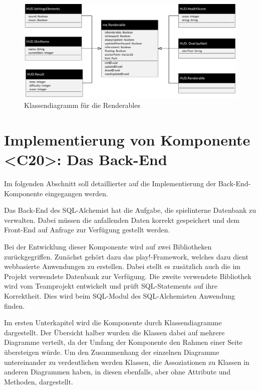 \newpage
\begin{figure}[ht]
\centering
\includegraphics[width=1.0\textwidth]{figures/KLassendiagrammRenderables.pdf}
\caption{Klassendiagramm für die Renderables}
\label{MErenderable}
\end{figure}    

\newpage


\newpage
\section{Implementierung von Komponente <C20>: Das Back-End}
\label{backend}

Im folgenden Abschnitt soll detaillierter auf die Implementierung der Back-End-Komponente eingegangen werden.

Das Back-End des SQL-Alchemist hat die Aufgabe, die spielinterne Datenbank zu verwalten. Dabei müssen die anfallenden Daten korrekt gespeichert und dem Front-End auf Anfrage zur Verfügung gestellt werden.

Bei der Entwicklung dieser Komponente wird auf zwei Bibliotheken zurückgegriffen. Zunächst gehört dazu das play!-Framework, welches dazu dient webbasierte Anwendungen zu erstellen. Dabei stellt es zusätzlich auch die im Projekt verwendete Datenbank zur Verfügung. Die zweite verwendete Bibliothek wird vom Teamprojekt entwickelt und prüft SQL-Statements auf ihre Korrektheit. Dies wird beim SQL-Modul des SQL-Alchemisten Anwendung finden. 

Im ersten Unterkapitel wird die Komponente durch Klassendiagramme dargestellt. Der Übersicht halber wurden die Klassen dabei auf mehrere Diagramme verteilt, da der Umfang der Komponente den Rahmen einer Seite übersteigen würde. Um den Zusammenhang der einzelnen Diagramme untereinander zu verdeutlichen werden Klassen, die Assoziationen zu Klassen in anderen Diagrammen haben, in diesen ebenfalls, aber ohne Attribute und Methoden, dargestellt.  


